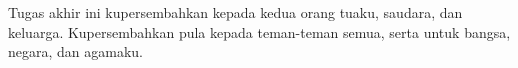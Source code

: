 \vspace{7cm}

\begin{center}
	Tugas akhir ini kupersembahkan kepada kedua orang tuaku, saudara, dan keluarga.
	Kupersembahkan pula kepada teman-teman semua, serta untuk bangsa, negara, dan agamaku.

\end{center}

